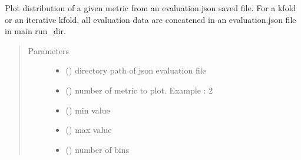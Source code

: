 \documentclass[letterpaper,10pt,english]{sphinxmanual}
\begin{document}

\begin{fulllineitems}
\label{\detokenize{PyTerK:pyterk.reporter.plot_distribution}}
\sphinxAtStartPar
Plot distribution of a given metric from an evaluation.json saved file.
For a kfold or an iterative kfold, all evaluation data are concatened in an evaluation.json file in main run\_dir.
\begin{quote}\begin{description}
\item[{Parameters}] \leavevmode\begin{itemize}
\item {} 
\sphinxAtStartPar
{} () \textendash{} directory path of json evaluation file

\item {} 
\sphinxAtStartPar
{} () \textendash{} number of metric to plot. Example : 2

\item {} 
\sphinxAtStartPar
{} () \textendash{} min value

\item {} 
\sphinxAtStartPar
{} () \textendash{} max value

\item {} 
\sphinxAtStartPar
{} () \textendash{} number of bins


\end{itemize}
\end{description}
\end{quote}
\end{fulllineitems}
\end{document}
